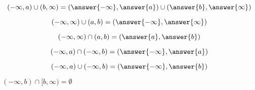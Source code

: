 \documentclass{ximera}
\begin{document}
\begin{exercise}
\[
(-\infty, a) \cup (b, \infty) = \left( \answer{-\infty}, \answer{a} \right) \cup \left( \answer{b}, \answer{\infty} \right)
\]
\end{exercise}








\begin{exercise}
\[
(-\infty, \infty) \cup (a, b) = \left( \answer{-\infty}, \answer{\infty} \right)
\]
\end{exercise}






\begin{exercise}
\[
(-\infty, \infty) \cap (a, b) = \left( \answer{a}, \answer{b} \right)
\]
\end{exercise}





\begin{exercise}
\[
(-\infty, a) \cap (-\infty, b) = \left( \answer{-\infty}, \answer{a} \right)
\]
\end{exercise}




\begin{exercise}
\[
(-\infty, a) \cup (-\infty, b) = \left( \answer{-\infty}, \answer{b} \right)
\]
\end{exercise}



\begin{exercise}

$(-\infty, b) \cap [b, \infty) = \emptyset$

\begin{multipleChoice}
\end{multipleChoice}

\end{exercise}
\end{document}
